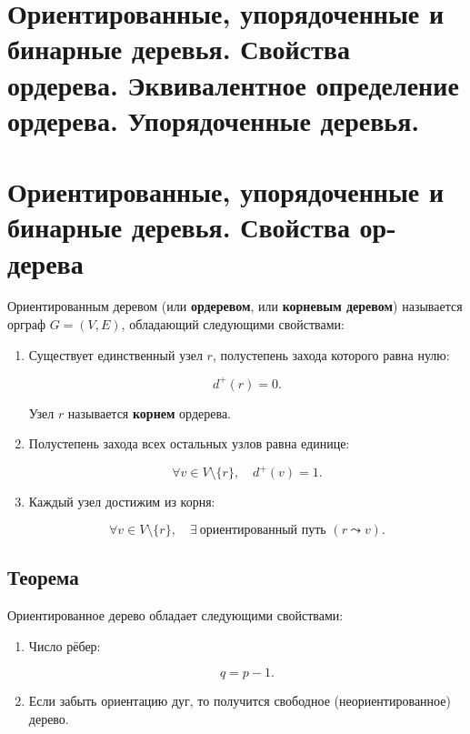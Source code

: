 {
	\section{Ориентированные, упорядоченные и бинарные деревья. Свойства ордерева.
Эквивалентное определение ордерева. Упорядоченные деревья.}

\section*{Ориентированные, упорядоченные и бинарные деревья. Свойства ор-
дерева}

Ориентированным деревом (или \textbf{ордеревом}, или \textbf{корневым деревом}) называется орграф $G = (V, E)$, обладающий следующими свойствами:

\begin{enumerate}
  \item Существует единственный узел $r$, полустепень захода которого равна нулю:  
  

\[
  d^+(r) = 0.
  \]


  Узел $r$ называется \textbf{корнем} ордерева.

  \item Полустепень захода всех остальных узлов равна единице:  
  

\[
  \forall v \in V \setminus \{r\},\quad d^+(v) = 1.
  \]



  \item Каждый узел достижим из корня:  
  

\[
  \forall v \in V \setminus \{r\},\quad \exists\ \text{ориентированный путь } (r \leadsto v).
  \]


\end{enumerate}

\subsection*{Теорема}

Ориентированное дерево обладает следующими свойствами:

\begin{enumerate}
  \item Число рёбер:  
  

\[
  q = p - 1.
  \]



  \item Если забыть ориентацию дуг, то получится свободное (неориентированное) дерево.


\end{enumerate}}
